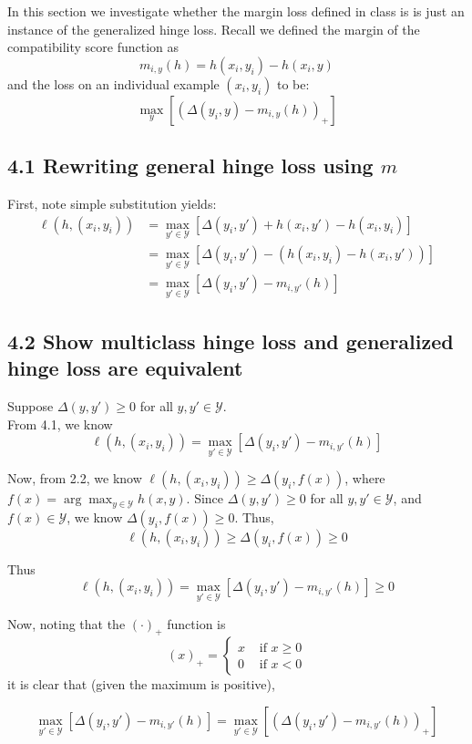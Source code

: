 \documentclass[paper=a4, fontsize=11pt]{scrartcl} %
\numberwithin{equation}{section} %
\numberwithin{figure}{section} %
\numberwithin{table}{section} %
\begin{document}
In this section we investigate whether the margin loss defined in class is is just an instance of the generalized hinge loss. Recall we defined the margin of the compatibility score function as
\[m_{i,y}(h) = h(x_i, y_i) - h(x_i, y)\]
and the loss on an individual example $(x_i, y_i)$ to be:
\[\max_{y}[(\Delta(y_i, y) - m_{i,y}(h))_{+}]\]

\subsection*{4.1 Rewriting general hinge loss using $m$}

First, note simple substitution yields:
\begin{align*}
\ell(h, (x_i, y_i)) &= \max_{y' \in \mathcal{Y}} [\Delta(y_i, y')+ h(x_i, y') - h(x_i,y_i)] \\
	&= \max_{y' \in \mathcal{Y}} [\Delta(y_i, y') - (h(x_i,y_i) - h(x_i, y'))] \\
	&= \max_{y' \in \mathcal{Y}} [\Delta(y_i, y') - m_{i,y'}(h)]
\end{align*}

\subsection*{4.2 Show multiclass hinge loss and generalized hinge loss are equivalent}

Suppose $\Delta(y, y') \geq 0$ for all $y, y' \in \mathcal{Y}$.\\

From 4.1, we know
\[\ell(h, (x_i, y_i)) = \max_{y' \in \mathcal{Y}} [\Delta(y_i, y') - m_{i,y'}(h)]\]

Now, from 2.2, we know $\ell(h, (x_i, y_i)) \geq \Delta(y_i, f(x))$, where $f(x) = \arg \max_{y \in \mathcal{Y}}h(x,y)$. Since $\Delta(y, y') \geq 0$ for all $y, y' \in \mathcal{Y}$, and $f(x) \in \mathcal{Y}$, we know $\Delta(y_i, f(x)) \geq 0$. Thus,
\[\ell(h, (x_i, y_i)) \geq \Delta(y_i, f(x)) \geq 0\]

Thus
\[\ell(h, (x_i, y_i)) = \max_{y' \in \mathcal{Y}} [\Delta(y_i, y') - m_{i,y'}(h)] \geq 0\]

Now, noting that the $(\cdot)_+$ function is
\[(x)_+ = 
\begin{cases}
x &\textrm{ if } x \geq 0\\
0 &\textrm{ if } x < 0
\end{cases}
\]
it is clear that (given the maximum is positive), 

\[\max_{y' \in \mathcal{Y}} [\Delta(y_i, y') - m_{i,y'}(h)] = \max_{y' \in \mathcal{Y}} \left[\left(\Delta(y_i, y') - m_{i,y'}(h)\right)_+\right]\]
\end{document}
